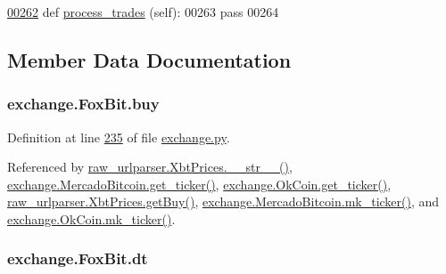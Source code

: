 \begin{DoxyCode}
\hypertarget{classexchange_1_1_fox_bit.tex_l00262}{}\hyperlink{classexchange_1_1_fox_bit_a244f81e91b04a1118d2d17f6c8497cb5}{00262}     \textcolor{keyword}{def }\hyperlink{classexchange_1_1_fox_bit_a244f81e91b04a1118d2d17f6c8497cb5}{process\_trades} (self):
00263         \textcolor{keywordflow}{pass}
00264      
\end{DoxyCode}


\subsection{Member Data Documentation}
\subsubsection[{\texorpdfstring{buy}{buy}}]{\setlength{\rightskip}{0pt plus 5cm}exchange.\+Fox\+Bit.\+buy}\hypertarget{classexchange_1_1_fox_bit_acb7e709cc05e8314b1bdacd32e4dfc80}{}\label{classexchange_1_1_fox_bit_acb7e709cc05e8314b1bdacd32e4dfc80}


Definition at line \hyperlink{exchange_8py_source_l00235}{235} of file \hyperlink{exchange_8py_source}{exchange.\+py}.



Referenced by \hyperlink{raw__urlparser_8py_source_l00074}{raw\+\_\+urlparser.\+Xbt\+Prices.\+\_\+\+\_\+str\+\_\+\+\_\+()}, \hyperlink{exchange_8py_source_l00306}{exchange.\+Mercado\+Bitcoin.\+get\+\_\+ticker()}, \hyperlink{exchange_8py_source_l00371}{exchange.\+Ok\+Coin.\+get\+\_\+ticker()}, \hyperlink{raw__urlparser_8py_source_l00062}{raw\+\_\+urlparser.\+Xbt\+Prices.\+get\+Buy()}, \hyperlink{exchange_8py_source_l00320}{exchange.\+Mercado\+Bitcoin.\+mk\+\_\+ticker()}, and \hyperlink{exchange_8py_source_l00385}{exchange.\+Ok\+Coin.\+mk\+\_\+ticker()}.

\subsubsection[{\texorpdfstring{dt}{dt}}]{\setlength{\rightskip}{0pt plus 5cm}exchange.\+Fox\+Bit.\+dt}\hypertarget{classexchange_1_1_fox_bit_a363f8488eb0423f88519c085ae6f168f}{}\label{classexchange_1_1_fox_bit_a363f8488eb0423f88519c085ae6f168f}


